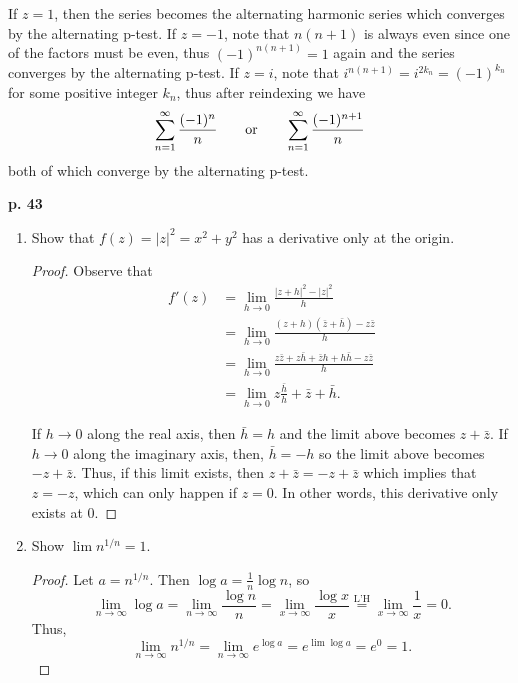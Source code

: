 \documentclass[11pt,oneside,english]{amsart}
\theoremstyle{definition}
\newcommand{\ospace}{\hspace{7mm}\text{or}\hspace{7mm}}
\newcommand{\lhe}{\stackrel{\text{L'H}}{=}}
\newcommand{\lom}[2]{\lim_{{#1}\rightarrow{#2}}}
\begin{document}
\begin{enumerate}[leftmargin=*]
If $z=1$, then the series becomes the alternating harmonic series which converges by the alternating p-test. If $z=-1$, note that $n(n+1)$ is always even since one of the factors must be even, thus $(-1)^{n(n+1)}=1$ again and the series converges by the alternating p-test. If $z=i$, note that $i^{n(n+1)}=i^{2k_n}=(-1)^{k_n}$ for some positive integer $k_n$, thus after reindexing we have
\[
\sum_{n=1}^\infty\frac{(-1)^n}{n} \ospace \sum_{n=1}^\infty\frac{(-1)^{n+1}}{n}
\]
both of which converge by the alternating p-test.

\end{enumerate}





\textbf{p. 43}


\begin{enumerate}[leftmargin=*]
\itemsep5mm


\item Show that $f(z)=|z|^2=x^2+y^2$ has a derivative only at the origin.

\begin{proof}
Observe that 
\begin{align*}
f'(z)&=\lom{h}{0}\frac{|z+h|^2-|z|^2}{h}\\[2mm]
&=\lom{h}{0}\frac{(z+h)(\bar z+\bar h)-z\bar z}{h}\\[2mm]
&=\lom{h}{0}\frac{z\bar z+z\bar h+\bar z h+h\bar h-z\bar z}{h}\\[2mm]
&=\lom{h}{0}z\frac{\bar h}{h}+\bar z+\bar h.
\end{align*}

If $h\to 0$ along the real axis, then $\bar h=h$ and the limit above becomes $z+\bar z$. If $h\to0$ along the imaginary axis, then, $\bar h=-h$ so the limit above becomes $-z+\bar z$. Thus, if this limit exists, then $z+\bar z=-z+\bar z$ which implies that $z=-z$, which can only happen if $z=0$. In other words, this derivative only exists at 0.
\end{proof}

\setcounter{enumi}{2}
\item Show $\lim n^{1/n}=1$.

\begin{proof}
Let $a=n^{1/n}$. Then $\log a=\frac{1}{n}\log n$, so
\[
\lom{n}{\infty}\log a=\lom{n}{\infty}\frac{\log n}{n}=\lom{x}{\infty}\frac{\log x}{x}\lhe\lom{x}{\infty}\frac{1}{x}=0.
\]
Thus,
\[
\lom{n}{\infty}n^{1/n}=\lom{n}{\infty}e^{\log a}=e^{\lim \log a}=e^0=1.
\]
\end{proof}


\end{enumerate}
\end{document}
